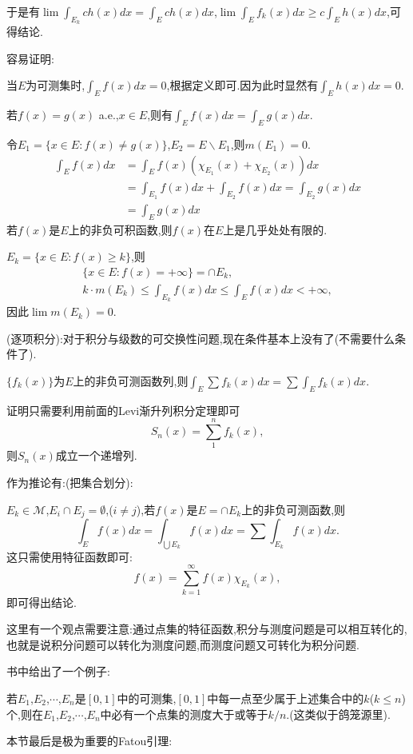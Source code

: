 \documentclass[12pt,a4paper,openany]{book}
\begin{document}
于是有$\lim{\int_{E_k}{ch(x)dx}} = \int_{E}{ch(x)dx}$,$\lim{\int_{E}{f_k(x)dx}} \ge c\int_{E}{h(x)dx}$,可得结论.

容易证明:

当$E$为可测集时,$\int_{E}{f(x)dx}=0$,根据定义即可.因为此时显然有$\int_{E}{h(x)dx}=0$.

若$f(x)=g(x)$ a.e.,$x \in E$,则有$\int_{E}{f(x)dx}=\int_{E}{g(x)dx}$.

令$E_1=\{x \in E:f(x) \neq g(x)\}$,$E_2=E\backslash E_1$,则$m(E_1)=0$.
\[
\begin{aligned}
\int_{E}{f(x)dx} &= \int_{E}{f(x)(\chi_{E_1}(x) + \chi_{E_2}(x))dx} \\
&= \int_{E_1}{f(x)dx} + \int_{E_2}{f(x)dx} = \int_{E_2}{g(x)dx} \\
&= \int_{E}{g(x)dx}
\end{aligned}
\]
若$f(x)$是$E$上的非负可积函数,则$f(x)$在$E$上是几乎处处有限的.

$E_k = \{x \in E: f(x) \ge k\}$,则
\begin{gather*}
\{x \in E: f(x) = +\infty\}=\cap{E_k},\\
k \cdot m(E_k) \le \int_{E_k}{f(x)dx} \le \int_{E}{f(x)dx} < +\infty,
\end{gather*}
因此$\lim{m(E_k)}=0$.

(逐项积分):对于积分与级数的可交换性问题,现在条件基本上没有了(不需要什么条件了).

$\{f_k(x)\}$为$E$上的非负可测函数列,则$\int_{E}{\sum{f_k(x)}dx} = \sum{\int_{E}{f_k(x)dx}}$.

证明只需要利用前面的Levi渐升列积分定理即可
\[
S_n(x) = \sum_{1}^{n}{f_k(x)},
\]
则$S_n(x)$成立一个递增列.

作为推论有:(把集合划分):

$E_k \in \mathcal{M}$,$E_i \cap E_j = \emptyset$,($i \neq j$),若$f(x)$是$E=\cap{E_k}$上的非负可测函数,则
\[
\int_{E}{f(x)dx} = \int_{\bigcup{E_k}}{f(x)dx}=\sum{\int_{E_k}{f(x)dx}}.
\]
这只需使用特征函数即可:
\[
f(x)=\sum_{k=1}^{\infty}{f(x)\chi_{E_k}(x)},
\]
即可得出结论.

这里有一个观点需要注意:通过点集的特征函数,积分与测度问题是可以相互转化的,也就是说积分问题可以转化为测度问题,而测度问题又可转化为积分问题.

书中给出了一个例子:

若$E_1$,$E_2$,$\cdots$,$E_n$是$[0,1]$中的可测集,$[0,1]$中每一点至少属于上述集合中的$k$($k \le n$)个,则在$E_1$,$E_2$,$\cdots$,$E_n$中必有一个点集的测度大于或等于$k/n$.(这类似于鸽笼源里).

本节最后是极为重要的Fatou引理:
\end{document}
